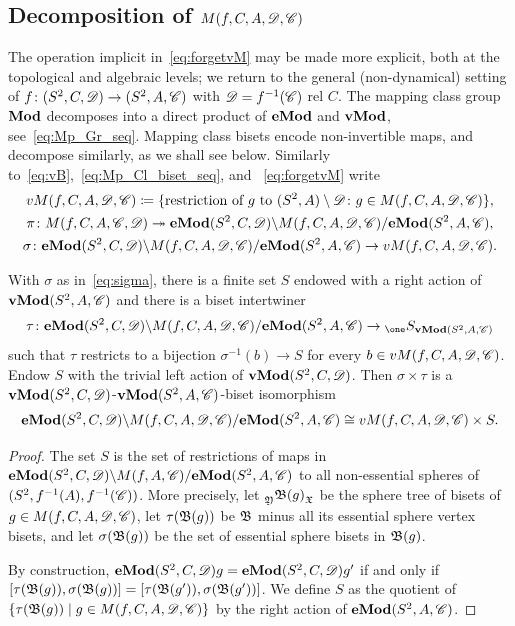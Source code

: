 \documentclass{amsart}
\begin{document}
\subsection{Decomposition of \boldmath $M(f,C,A,\DD,\CC)$}
\label{ss:DecompOfMCB}
The operation implicit in~\eqref{eq:forgetvM} may be made more explicit,
both at the topological and algebraic levels; we return to the general
(non-dynamical) setting of $f\colon (S^2,C,\DD)\to (S^2,A,\CC)$ with
$\DD=f^{-1}(\CC)$ rel $C$. The mapping class group $\Mod$ decomposes into a
direct product of $\Mod[e]$ and $\Mod[v]$,
see~\eqref{eq:Mp_Gr_seq}. Mapping class bisets encode non-invertible maps,
and decompose similarly, as we shall see below. Similarly
to~\eqref{eq:vB},~\eqref {eq:Mp_Cl_biset_seq}, and ~\eqref{eq:forgetvM}
write
\begin{gather}
  vM(f,C,A,\DD,\CC)\coloneqq\{\text{restriction of } g \text{ to }(S^2,A)\setminus\DD\colon g\in M(f,C,A,\DD,\CC)\},\notag\\
  \pi \colon  M(f,C,A,\CC,\DD)\twoheadrightarrow \Mod[e](S^2,C,\DD)\backslash M(f,C,A,\DD,\CC)/\Mod[e](S^2,A,\CC),\notag\\
  \sigma \colon \Mod[e](S^2,C,\DD)\backslash M(f,C,A,\DD,\CC)/\Mod[e](S^2,A,\CC) \to  vM(f,C,A,\DD,\CC).\label{eq:sigma}
\end{gather}

\begin{lem}\label{lem:ExtOFvM}
  With $\sigma$ as in~\eqref{eq:sigma}, there is a finite set $S$
  endowed with a right action of $\Mod[v](S^2,A,\CC)$ and there is a
  biset intertwiner
  \[\tau\colon \Mod[e](S^2,C,\DD)\backslash M(f,C,A,\DD,\CC)/\Mod[e](S^2,A,\CC)\to \subscript{\one}{S} _{\Mod[v](S^2,A,\CC)}
  \]
  such that $\tau$ restricts to a bijection $\sigma^{-1}(b)\to S$ for
  every $b\in vM(f,C,A,\DD,\CC)$. Endow $S$ with the trivial left
  action of $\Mod[v](S^2,C,\DD)$. Then $\sigma\times \tau$ is a
  $\Mod[v](S^2,C,\DD)$-$\Mod[v](S^2,A,\CC)$-biset isomorphism
  \[\Mod[e](S^2,C,\DD)\backslash M(f,C,A,\DD,\CC)/\Mod[e](S^2,A,\CC) \cong vM(f,C,A,\DD,\CC) \times S.\] 
\end{lem}
\begin{proof}
  The set $S$ is the set of restrictions of maps in
  $\Mod[e](S^2,C,\DD)\backslash M(f,A,\CC)/\Mod[e](S^2,A,\CC)$ to all
  non-essential spheres of $(S^2,f^{-1}(A),f^{-1}(\CC))$. More
  precisely, let $\subscript\gfY{\gfB(g)}_\gf$ be the sphere tree of
  bisets of $g\in M(f,C,A,\DD,\CC)$, let $\tau(\gfB(g))$ be $\gfB$
  minus all its essential sphere vertex bisets, and let
  $\sigma (\gfB(g))$ be the set of essential sphere bisets in
  $\gfB(g)$.

  By construction, $\Mod[e](S^2,C,\DD)g=\Mod[e](S^2,C,\DD)g'$ if and
  only if
  $[\tau(\gfB(g)),\sigma(\gfB(g))]=[\tau(\gfB(g')),\sigma(\gfB(g'))]$. We
  define $S$ as the quotient of
  $\{\tau(\gfB(g))\mid g\in M(f,C,A,\DD,\CC)\}$ by the right action of
  $\Mod[e](S^2,A,\CC)$.
\end{proof}
\end{document}
